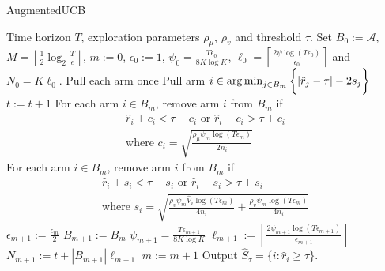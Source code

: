 \begin{algorithm}[th!]
\caption{AugmentedUCB}
\label{alg:augucb}
\begin{algorithmic}
 Time horizon $T$, exploration parameters $\rho_{\mu}$, $\rho_v$ and threshold $\tau$.
 Set $B_{0}:=\mathcal{A}$, $M=\left\lfloor \frac{1}{2}\log_{2} \frac{T}{e}\right\rfloor $, $m:=0$, $\epsilon_{0}:=1$, $\psi_{0}=\frac{T\epsilon_{0}}{8K\log K}$, $\ell_{0}=\left\lceil \frac{2\psi\log( T\epsilon_{0})}{\epsilon_{0}} \right\rceil$ and $N_{0}=K\ell_{0} $.
\State Pull each arm once
\State {}
\State Pull arm $i\in\operatorname*{arg\,min}_{j\in B_{m}}\bigg\lbrace |\hat{r}_{j} - \tau | - 2s_{j}\bigg\rbrace$
\State $t:=t+1$ 
\ArmElim
\State For each arm $i \in B_{m}$, remove arm ${i}$ from $B_{m}$ if
\begin{align*}
\hat{r}_{i} + c_i  < \tau - c_i \mbox{ or } \hat{r}_{i} - c_i  > \tau + c_i \\
\text{where $c_i=\sqrt{\frac{\rho_{\mu}\psi_{m}\log{( T\epsilon_{m})}}{2 n_{i}}}$}
\end{align*}
\EndArmElim
\ArmElimV
\State For each arm $i \in B_{m}$, remove arm ${i}$ from $B_{m}$ if
\begin{align*}
\hat{r}_{i} + s_i  < \tau - s_i \mbox{ or } \hat{r}_{i} - s_i  > \tau + s_i \\
\text{where $s_i=\sqrt{\frac{\rho_v\psi_{m}\hat{V}_{i}\log{( T\epsilon_{m})}}{4 n_{i}} + \frac{\rho_v\psi_{m} \log{(T\epsilon_{m})}}{4 n_{i}}}$}
\end{align*}
\EndArmElimV
\State {}
\ResetParam
\State $\epsilon_{m+1}:=\frac{\epsilon_{m}}{2}$
\State $B_{m+1} := B_{m}$
\State $\psi_{m+1}=\frac{T\epsilon_{m+1}}{8 K\log K}$
\State $\ell_{m+1}:=\left\lceil \frac{2\psi_{m+1}\log( T\epsilon_{m+1})}{\epsilon_{m+1}} \right\rceil$
\State $N_{m+1} := t + |B_{m+1}|\ell_{m+1}$
\State $m := m+1$
\EndResetParam
\EndIf
\EndFor
\State Output $\hat{S}_{\tau}=\lbrace i: \hat{r}_{i}\geq \tau \rbrace$.
\end{algorithmic}
\end{algorithm}

